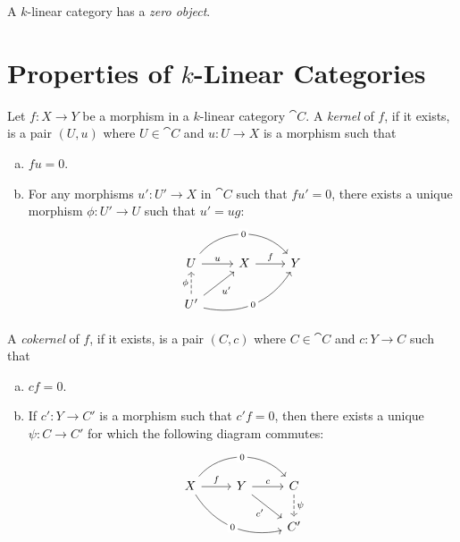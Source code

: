 \begin{corollary}
\label{cor:k-linear-category-has-zero-object}
A \(k\)-linear category has a \emph{zero object}.
\end{corollary}

\section{Properties of \texorpdfstring{\(k\)}{k}-Linear Categories}

\begin{definition}
\label{def:k-linear-cat-kernel}
Let \(f: X \to Y\) be a morphism in a \(k\)-linear category \(\cat C\). A
\emph{kernel} of \(f\), if it exists, is a pair \((U, u)\) where
\(U \in \cat C\) and \(u: U \to X\) is a morphism such that
\begin{enumerate}[(a)]\setlength\itemsep{0em}
\item \(f u = 0\).
\item For any morphisms \(u': U' \to X\) in \(\cat C\) such that \(f u' = 0\),
  there exists a unique morphism \(\phi: U' \to U\) such that \(u' = u g\):
  \[
  \begin{tikzcd}
  U \ar[r, "u"] \ar[rr, bend left=50, "0" description]
  &X \ar[r, "f"]
  &Y
  \\
  U' \ar[u, "\phi", dashed] \ar[ru, "u'"'] \ar[rru, bend right=35, "0" description]
  & &
  \end{tikzcd}
  \]
\end{enumerate}

A \emph{cokernel} of \(f\), if it exists, is a pair \((C, c)\) where
\(C \in \cat C\) and \(c: Y \to C\) such that
\begin{enumerate}[(a)]\setlength\itemsep{0em}
\item \(c f = 0\).

\item If \(c': Y \to C'\) is a morphism such that \(c' f = 0\), then there exists
  a unique \(\psi: C \to C'\) for which the following diagram commutes:
  \[
  \begin{tikzcd}
  X
  \ar[r, "f"]
  \ar[rrd, bend right=35, "0" description]
  \ar[rr, bend left=50, "0" description]
  &Y
  \ar[r, "c"]
  \ar[dr, "c'"']
  &C \ar[d, "\psi", dashed]
  \\
  &
  &C'
  \end{tikzcd}
  \]
\end{enumerate}
\end{definition}

